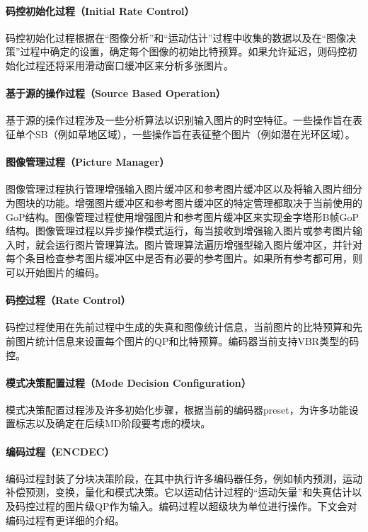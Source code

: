   \paragraph{码控初始化过程（Initial Rate Control）} 码控初始化过程根据在“图像分析”和“运动估计”过程中收集的数据以及在“图像决策”过程中确定的设置，确定每个图像的初始比特预算。如果允许延迟，则码控初始化过程还将采用滑动窗口缓冲区来分析多张图片。

  \paragraph{基于源的操作过程（Source Based Operation）} 基于源的操作过程涉及一些分析算法以识别输入图片的时空特征。一些操作旨在表征单个SB（例如草地区域），一些操作旨在表征整个图片（例如潜在光环区域）。

  \paragraph{图像管理过程（Picture Manager）} 图像管理过程执行管理增强输入图片缓冲区和参考图片缓冲区以及将输入图片细分为图块的功能。增强图片缓冲区和参考图片缓冲区的特定管理都取决于当前使用的GoP结构。图像管理过程使用增强图片和参考图片缓冲区来实现金字塔形B帧GoP结构。图像管理过程以异步操作模式运行，每当接收到增强输入图片或参考图片输入时，就会运行图片管理算法。图片管理算法遍历增强型输入图片缓冲区，并针对每个条目检查参考图片缓冲区中是否有必要的参考图片。如果所有参考都可用，则可以开始图片的编码。

  \paragraph{码控过程（Rate Control）} 码控过程使用在先前过程中生成的失真和图像统计信息，当前图片的比特预算和先前图片统计信息来设置每个图片的QP和比特预算。编码器当前支持VBR类型的码控。

  \paragraph{模式决策配置过程（Mode Decision Configuration）} 模式决策配置过程涉及许多初始化步骤，根据当前的编码器preset，为许多功能设置标志以及确定在后续MD阶段要考虑的模块。

  \paragraph{编码过程（ENCDEC）} 编码过程封装了分块决策阶段，在其中执行许多编码器任务，例如帧内预测，​​运动补偿预测，变换，量化和模式决策。它以运动估计过程的“运动矢量”和失真估计以及码控过程的图片级QP作为输入。编码过程以超级块为单位进行操作。下文会对编码过程有更详细的介绍。

